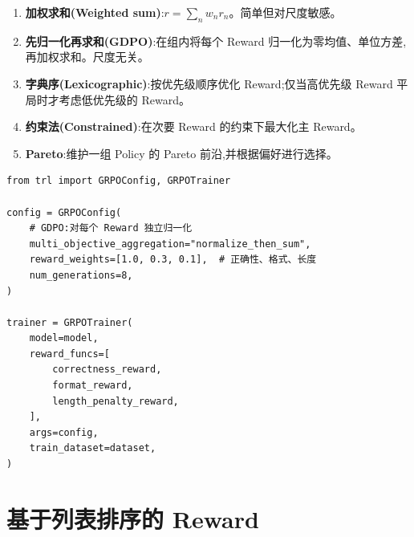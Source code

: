 \begin{keybox}
\begin{enumerate}
  \item \textbf{加权求和(Weighted sum)}:$r = \sum_n w_n r_n$。简单但对尺度敏感。
  \item \textbf{先归一化再求和(GDPO)}:在组内将每个 Reward 归一化为零均值、单位方差,再加权求和。尺度无关。
  \item \textbf{字典序(Lexicographic)}:按优先级顺序优化 Reward;仅当高优先级 Reward 平局时才考虑低优先级的 Reward。
  \item \textbf{约束法(Constrained)}:在次要 Reward 的约束下最大化主 Reward。
  \item \textbf{Pareto}:维护一组 Policy 的 Pareto 前沿,并根据偏好进行选择。
\end{enumerate}
\end{keybox}

\begin{examplebox}
\begin{lstlisting}[style=pythonstyle]
from trl import GRPOConfig, GRPOTrainer

config = GRPOConfig(
    # GDPO:对每个 Reward 独立归一化
    multi_objective_aggregation="normalize_then_sum",
    reward_weights=[1.0, 0.3, 0.1],  # 正确性、格式、长度
    num_generations=8,
)

trainer = GRPOTrainer(
    model=model,
    reward_funcs=[
        correctness_reward,
        format_reward,
        length_penalty_reward,
    ],
    args=config,
    train_dataset=dataset,
)
\end{lstlisting}
\end{examplebox}

\section{基于列表排序的 Reward}
\label{listwise-rank-based-rewards}


